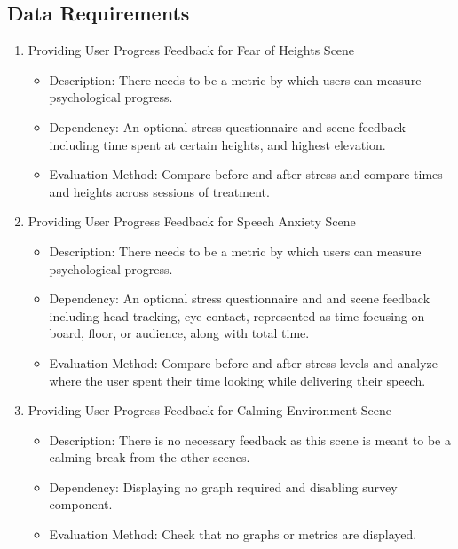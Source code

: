 \documentclass[a4paper,10pt]{article}
\begin{document}
	\subsection{Data Requirements}
	\begin{enumerate}
	\item Providing User Progress Feedback for Fear of Heights Scene
	\begin{itemize}
	  \item Description: There needs to be a metric by which users can measure psychological progress.
	  \item Dependency: An optional stress questionnaire and scene feedback including time spent at certain heights, and highest elevation.
	  \item Evaluation Method: Compare before and after stress and compare times and heights across sessions of treatment.
	\end{itemize}
	\item Providing User Progress Feedback for Speech Anxiety Scene
	\begin{itemize}
		\item Description: There needs to be a metric by which users can measure psychological progress.
	  \item Dependency: An optional stress questionnaire and and scene feedback including  head tracking, eye contact, represented as time focusing on board, floor, or audience, along with total time.
		\item Evaluation Method: Compare before and after stress levels and analyze where the user spent their time looking while delivering their speech.
	\end{itemize}
	\item Providing User Progress Feedback for Calming Environment Scene
	\begin{itemize}
		\item Description: There is no necessary feedback as this scene is meant to be a calming break from the other scenes.
		\item Dependency: Displaying no graph required and disabling survey component.
		\item Evaluation Method: Check that no graphs or metrics are displayed. 
	\end{itemize}	
	\end{enumerate}
	
\end{document}
